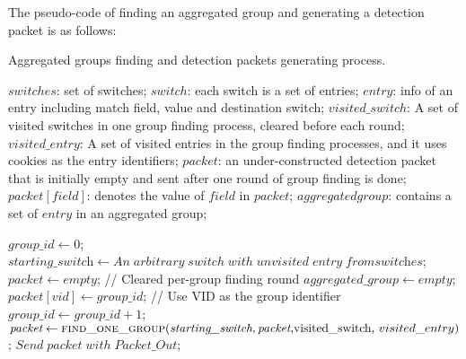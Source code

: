 The pseudo-code of finding an aggregated group and generating a detection packet is as follows:

\begin {tcolorbox}[blanker,float=tbp,
grow to left by=1cm, grow to right by=1cm]
\label{pseudo}
\begin{algorithm}[H]

  \caption{Aggregated groups finding and detection packets generating process.}
  \begin{algorithmic}[1]
    \Require
      $switches$: set of switches;  \newline
      $switch$: each switch is a set of entries;  \newline
      $entry$: info of an entry including match field, value and destination switch;  \newline
      $visited\_switch$: A set of visited switches in one group finding process, cleared before each round;  \newline
      $visited\_entry$: A set of visited entries in the group finding processes, and it uses cookies as the entry identifiers; \newline
      $packet$: an under-constructed detection packet that is initially empty and sent after one round of group finding is done; \newline
      $packet[field]$: denotes the value of $field$ in $packet$; \newline
      $aggregated group$: contains a set of $entry$ in an aggregated group; \newline

      
      \State $\textit{group\_id} \gets 0$;
            \State $\textit{starting\_switch} \gets An\;arbitrary\;switch\;with\;unvisited\;entry\;from\textit{switches}$;
            \State $\textit{packet} \gets empty$;   // Cleared per-group finding round
            \State $\textit{aggregated\_group} \gets empty$;
            \State $packet[vid] \gets \textit{group\_id}$;   // Use VID as the group identifier 
            \State $group\_id \gets \textit{group\_id} + 1$;
            \State $\textit{packet} \gets \Call{find\_one\_group}{\textit{starting\_switch}, \textit{packet}, $visited\_switch, $visited\_entry}$;
            \State $Send\;\textit{packet}\;with\;Packet\_Out$;
      \EndWhile
    \EndFunction
  \end{algorithmic}
\end{algorithm}
\end{tcolorbox}

